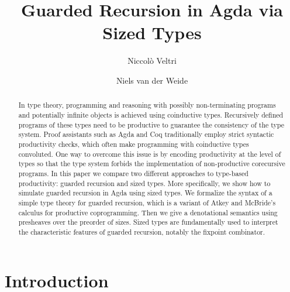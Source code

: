 \documentclass[a4paper,UKenglish,cleveref, autoref,numberwithinsect]{lipics-v2019}
\title{Guarded Recursion in Agda via Sized Types}
\author{Niccol\`o Veltri}{Department of Computer Science, IT
  University of Copenhagen, Denmark}{nive@itu.dk}{https://orcid.org/0000-0002-7230-3436}{This work was supported by a research grant (13156) from VILLUM FONDEN,
  and by DFF-Research Project 1 Grant no. 4002-00442, from The Danish Council 
  for Independent Research for the Natural Sciences (FNU).}
\author{Niels van der Weide}{Institute for Computation and Information Sciences, Radboud University, Nijmegen, The Netherlands}{nweide@cs.ru.nl}{https://orcid.org/0000-0003-1146-4161}{}
\begin{document}
\maketitle

\begin{abstract}
  In type theory, programming and reasoning with possibly
  non-terminating programs and potentially infinite objects is
  achieved using coinductive types. Recursively defined programs of
  these types need to be productive to guarantee the
  consistency of the type system. Proof assistants such as Agda and
  Coq traditionally employ strict syntactic productivity checks, which
  often make programming with coinductive types convoluted.  One
  way to overcome this issue is by encoding productivity at the level
  of types so that the type system forbids the implementation of
  non-productive corecursive programs.
  In this paper we compare two different approaches to type-based
  productivity: guarded recursion and sized types. More specifically,
  we show how to simulate guarded recursion in Agda using sized
  types. We formalize the syntax of a simple type theory for guarded
  recursion, which is a variant of Atkey and McBride's
  calculus for productive coprogramming. Then we give a denotational semantics
  using presheaves over the preorder of sizes. Sized types are
  fundamentally used to interpret the characteristic
  features of guarded recursion, notably the fixpoint combinator.
\end{abstract}

\section{Introduction}
\label{sec:intro}

\end{document}
